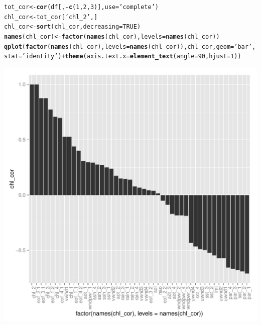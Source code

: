 \documentclass{article}\usepackage[]{graphicx}\usepackage[]{color}
\makeatletter
\def\maxwidth{ %
  \ifdim\Gin@nat@width>\linewidth
    \linewidth
  \else
    \Gin@nat@width
  \fi
}
\newcommand{\hlnum}[1]{\textcolor[rgb]{0.686,0.059,0.569}{#1}}%
\newcommand{\hlstr}[1]{\textcolor[rgb]{0.192,0.494,0.8}{#1}}%
\newcommand{\hlopt}[1]{\textcolor[rgb]{0,0,0}{#1}}%
\newcommand{\hlstd}[1]{\textcolor[rgb]{0.345,0.345,0.345}{#1}}%
\newcommand{\hlkwb}[1]{\textcolor[rgb]{0.69,0.353,0.396}{#1}}%
\newcommand{\hlkwc}[1]{\textcolor[rgb]{0.333,0.667,0.333}{#1}}%
\newcommand{\hlkwd}[1]{\textcolor[rgb]{0.737,0.353,0.396}{\textbf{#1}}}%
\newenvironment{kframe}{%
 \def\at@end@of@kframe{}%
 \ifinner\ifhmode%
  \def\at@end@of@kframe{\end{minipage}}%
  \begin{minipage}{\columnwidth}%
 \fi\fi%
 \def\FrameCommand##1{\hskip\@totalleftmargin \hskip-\fboxsep
 \colorbox{shadecolor}{##1}\hskip-\fboxsep
     \hskip-\linewidth \hskip-\@totalleftmargin \hskip\columnwidth}%
 \MakeFramed {\advance\hsize-\width
   \@totalleftmargin\z@ \linewidth\hsize
   \@setminipage}}%
 {\par\unskip\endMakeFramed%
 \at@end@of@kframe}
\newenvironment{knitrout}{}{} %
\makeatother
\begin{document}
\begin{knitrout}
\color{fgcolor}\begin{kframe}
\begin{alltt}
\hlstd{tot_cor} \hlkwb{<-} \hlkwd{cor}\hlstd{(df[,}\hlopt{-}\hlkwd{c}\hlstd{(}\hlnum{1}\hlstd{,}\hlnum{2}\hlstd{,}\hlnum{3}\hlstd{)],} \hlkwc{use}\hlstd{=}\hlstr{'complete'}\hlstd{)}
\hlstd{chl_cor} \hlkwb{<-} \hlstd{tot_cor[}\hlstr{'chl_2'}\hlstd{,]}
\hlstd{chl_cor} \hlkwb{<-} \hlkwd{sort}\hlstd{(chl_cor,} \hlkwc{decreasing}\hlstd{=}\hlnum{TRUE}\hlstd{)}
\hlkwd{names}\hlstd{(chl_cor)} \hlkwb{<-} \hlkwd{factor}\hlstd{(}\hlkwd{names}\hlstd{(chl_cor),} \hlkwc{levels}\hlstd{=}\hlkwd{names}\hlstd{(chl_cor))}
\hlkwd{qplot}\hlstd{(}\hlkwd{factor}\hlstd{(}\hlkwd{names}\hlstd{(chl_cor),} \hlkwc{levels}\hlstd{=}\hlkwd{names}\hlstd{(chl_cor)), chl_cor,} \hlkwc{geom}\hlstd{=}\hlstr{'bar'}\hlstd{,} \hlkwc{stat}\hlstd{=}\hlstr{'identity'}\hlstd{)} \hlopt{+} \hlkwd{theme}\hlstd{(}\hlkwc{axis.text.x} \hlstd{=} \hlkwd{element_text}\hlstd{(}\hlkwc{angle} \hlstd{=} \hlnum{90}\hlstd{,} \hlkwc{hjust} \hlstd{=} \hlnum{1}\hlstd{))}
\end{alltt}


{\ttfamily\noindent\color{warningcolor}{\#\# Warning: Stacking not well defined when ymin != 0}}\end{kframe}
\includegraphics[width=\maxwidth]{figure/unnamed-chunk-34-1} 

\end{knitrout}
\end{document}
